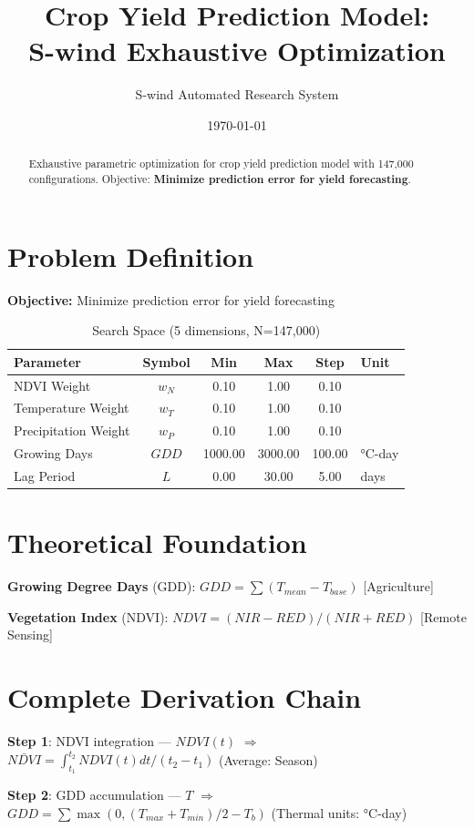 \documentclass[11pt,twocolumn]{article}
\title{Crop Yield Prediction Model: \\S-wind Exhaustive Optimization}
\author{S-wind Automated Research System}
\date{\today}
\begin{document}
\maketitle

\begin{abstract}
Exhaustive parametric optimization for crop yield prediction model with 147,000 configurations.
Objective: \textbf{Minimize prediction error for yield forecasting}.
\end{abstract}

\section{Problem Definition}
\textbf{Objective:} Minimize prediction error for yield forecasting

\begin{table}[h]
\centering
\caption{Search Space (5 dimensions, N=147,000)}
\begin{tabular}{@{}lccccl@{}}
\toprule
Parameter & Symbol & Min & Max & Step & Unit \\
\midrule
NDVI Weight & $w_N$ & 0.10 & 1.00 & 0.10 &  \\
Temperature Weight & $w_T$ & 0.10 & 1.00 & 0.10 &  \\
Precipitation Weight & $w_P$ & 0.10 & 1.00 & 0.10 &  \\
Growing Days & $GDD$ & 1000.00 & 3000.00 & 100.00 & °C-day \\
Lag Period & $L$ & 0.00 & 30.00 & 5.00 & days \\
\bottomrule
\end{tabular}
\end{table}

\section{Theoretical Foundation}
\textbf{Growing Degree Days} (GDD): $GDD = \sum(T_{mean} - T_{base})$ [Agriculture]

\textbf{Vegetation Index} (NDVI): $NDVI = (NIR-RED)/(NIR+RED)$ [Remote Sensing]


\section{Complete Derivation Chain}
\textbf{Step 1}: NDVI integration --- $NDVI(t)$ $\Rightarrow$ $\bar{NDVI} = \int_{t_1}^{t_2} NDVI(t) dt / (t_2-t_1)$ (Average: Season)


\textbf{Step 2}: GDD accumulation --- $T$ $\Rightarrow$ $GDD = \sum \max(0, (T_{max}+T_{min})/2 - T_b)$ (Thermal units: °C-day)
\end{document}
